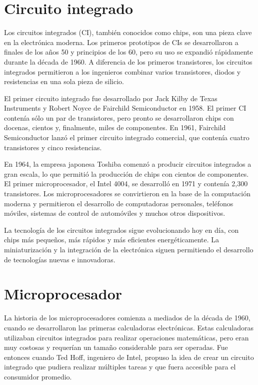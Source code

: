\documentclass{article}
\begin{document}
\section*{Circuito integrado}

Los circuitos integrados (CI), también conocidos como chips, son una pieza clave en la electrónica moderna. 
Los primeros prototipos de CIs se desarrollaron a finales de los años 50 y principios de los 60, 
pero su uso se expandió rápidamente durante la década de 1960. A diferencia de los primeros transistores, 
los circuitos integrados permitieron a los ingenieros combinar varios transistores, diodos y resistencias 
en una sola pieza de silicio.

El primer circuito integrado fue desarrollado por Jack Kilby de Texas Instruments 
y Robert Noyce de Fairchild Semiconductor en 1958. El primer CI contenía sólo un par de transistores, 
pero pronto se desarrollaron chips con docenas, cientos y, finalmente, miles de componentes. 
En 1961, Fairchild Semiconductor lanzó el primer circuito integrado comercial, que contenía 
cuatro transistores y cinco resistencias.

En 1964, la empresa japonesa Toshiba comenzó a producir circuitos integrados a gran escala, 
lo que permitió la producción de chips con cientos de componentes. El primer microprocesador, 
el Intel 4004, se desarrolló en 1971 y contenía 2,300 transistores. Los microprocesadores se convirtieron 
en la base de la computación moderna y permitieron el desarrollo de computadoras personales, teléfonos móviles, 
sistemas de control de automóviles y muchos otros dispositivos.

La tecnología de los circuitos integrados sigue evolucionando hoy en día, con chips más pequeños, más rápidos 
y más eficientes energéticamente. La miniaturización y la integración de la electrónica siguen permitiendo 
el desarrollo de tecnologías nuevas e innovadoras.

\section*{Microprocesador}

La historia de los microprocesadores comienza a mediados de la década de 1960, cuando se desarrollaron 
las primeras calculadoras electrónicas. Estas calculadoras utilizaban circuitos integrados 
para realizar operaciones matemáticas, pero eran muy costosas y requerían un tamaño considerable para ser operadas. 
Fue entonces cuando Ted Hoff, ingeniero de Intel, propuso la idea de crear un circuito integrado 
que pudiera realizar múltiples tareas y que fuera accesible para el consumidor promedio.
\end{document}
